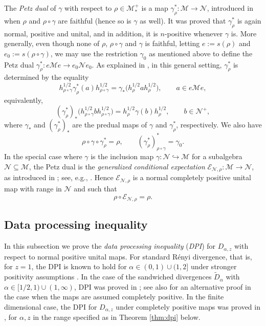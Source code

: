 \documentclass[12pt]{article}
\theoremstyle{definition}
\theoremstyle{remark}
\numberwithin{equation}{section}
\def\cE{\mathcal E}
\def\Me{\mathcal M}
\def\Ne{\mathcal N}
\begin{document}
The \emph{Petz dual} of $\gamma$ with respect to $\rho\in \Me_*^+$ is a map
$\gamma_\rho^*:\Me\to \Ne$, introduced in \cite{petz1988sufficiency} {when $\rho$ and
$\rho\circ\gamma$ are faithful (hence so is $\gamma$ as well).} It was proved that
$\gamma_\rho^*$ is again normal, positive and unital, and in addition, it is $n$-positive whenever
$\gamma$ is. More generally, {even though none of $\rho$, $\rho\circ\gamma$ and
$\gamma$ is faithful, letting $e:=s(\rho)$ and $e_0:=s(\rho\circ\gamma)$,} we may use the restriction
$\gamma_0$ as mentioned above to define the Petz dual $\gamma^*_\rho: e\Me e\to e_0\Ne e_0$. 
As explained in \cite{jencova2018renyi}, in this general setting, $\gamma^*_\rho$ is determined by
the equality
\[
h_{\rho\circ\gamma}^{1/2}\gamma_\rho^*(a)h_{\rho\circ\gamma}^{1/2}
=\gamma_*\bigl(h_\rho^{1/2}ah_\rho^{1/2}\bigr),
\qquad a\in e\Me e,
\]
equivalently,
\begin{equation}\label{eq:petzdual}
(\gamma^*_\rho)_*\bigl(h_{\rho\circ\gamma}^{1/2}bh_{\rho\circ\gamma}^{1/2}\bigr)
=h_\rho^{1/2}\gamma(b)h_\rho^{1/2},\qquad b\in\Ne^+,
\end{equation}
where $\gamma_*$ and $(\gamma^*_\rho)_*$ are the predual maps of $\gamma$ and $\gamma^*_\rho$,
respectively.
We also have
\begin{equation}\label{eq:petzdual2}
\rho\circ\gamma\circ\gamma^*_\rho=\rho,\qquad (\gamma_\rho^*)_{\rho\circ\gamma}^*=\gamma_0.
\end{equation}
In the special case where $\gamma$ is the
inclusion map $\gamma: \Ne\hookrightarrow \Me$ for a subalgebra $\Ne\subseteq \Me$, the Petz dual
is the \emph{generalized conditional expectation} $\cE_{\Ne,\rho}:\Me\to \Ne$, as introduced in
\cite{accardi1982conditional}; see, e.g., \cite[Proposition 6.5]{hiai2021quantum}. Hence 
$\cE_{\Ne,\rho}$ is a normal completely positive unital map with range in $\Ne$ and such that 
\[
\rho\circ \cE_{\Ne,\rho}=\rho.
\]


\subsection{Data processing inequality}

In this {subsection} we prove the \emph{data processing inequality} (\emph{DPI}) for
$D_{\alpha,z}$ with respect to normal positive unital maps. For standard R\'enyi divergence, that is,
for $z=1$, {the} DPI is known to hold for $\alpha\in (0,1)\cup (1,2]$ under stronger positivity
assumptions \cite{hiai2018quantum}. In the case of the sandwiched divergences $\tilde D_\alpha$ with
{$\alpha\in[1/2,1)\cup(1,\infty)$,} DPI was proved in \cite{jencova2018renyi,jencova2021renyi};
see also \cite{berta2018renyi} for an alternative proof in the case when the maps are assumed
completely positive. In the finite dimensional case, {the DPI for $D_{\alpha,z}$ under completely
positive maps was proved in \cite{zhang2020fromwyd}, for $\alpha,z$ in the range specified as
in Theorem \ref{thm:dpi} below.}
\end{document}
